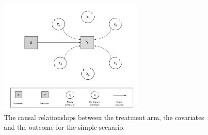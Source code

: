 \documentclass{article}
\begin{document}
\begin{figure}[t]
\centerline{\includegraphics[width=0.65\textwidth]{figures/DAGsimple}}
\caption{The causal relationships between the treatment arm, the covariates and the outcome for the simple  scenario.\label{fig2}}
\end{figure}
\end{document}
